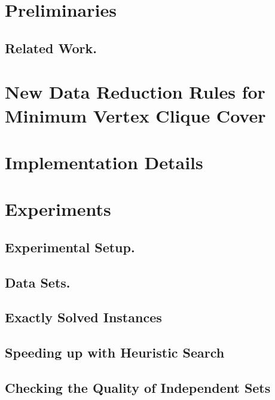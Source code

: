 \documentclass[sigconf]{acmart}
\begin{document}
\section{Preliminaries}
\label{sec:Preliminaries}
\subsection{Related Work.}
\label{sec:RelatedWork}

\section{New Data Reduction Rules for Minimum Vertex Clique Cover}
\section{Implementation Details}
\section{Experiments}
\subsection{Experimental Setup.}
\subsection{Data Sets.}
\subsection{Exactly Solved Instances}
\subsection{Speeding up with Heuristic Search}
\subsection{Checking the Quality of Independent Sets}



\end{document}
